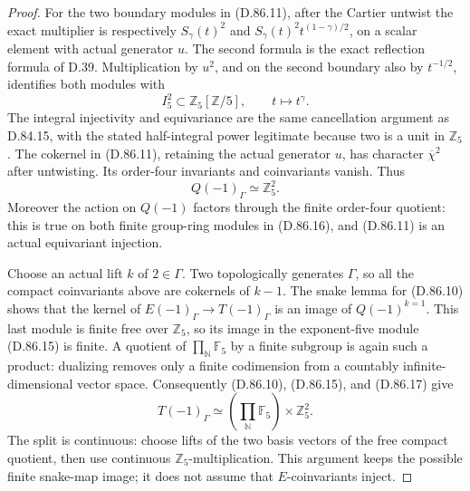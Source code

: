 \begin{proof}
For the two boundary modules in (D.86.11), after the Cartier
untwist the exact multiplier is respectively
\(S_\gamma(t)^2\) and
\(S_\gamma(t)^2t^{(1-\gamma)/2}\), on a scalar element
with actual generator \(u\). The second formula is the exact
reflection formula of D.39. Multiplication by \(u^2\), and
on the second boundary also by \(t^{-1/2}\), identifies both
modules with
\[
 I_5^2\subset\mathbb Z_5[\mathbb Z/5],
 \qquad t\longmapsto t^\gamma.                         \tag{D.86.16}
\]
The integral injectivity and equivariance are the same
cancellation argument as D.84.15, with the stated half-integral
power legitimate because two is a unit in \(\mathbb Z_5\).
The cokernel in (D.86.11), retaining the actual generator \(u\),
has character \(\overline\chi^2\) after untwisting. Its
order-four invariants and coinvariants vanish. Thus
\[
                      Q(-1)_\Gamma\simeq\mathbb Z_5^2.
                                                               \tag{D.86.17}
\]
Moreover the action on \(Q(-1)\) factors through the finite
order-four quotient: this is true on both finite group-ring
modules in (D.86.16), and (D.86.11) is an actual equivariant
injection.

Choose an actual lift \(k\) of \(2\in\Gamma\). Two
topologically generates \(\Gamma\), so all the compact
coinvariants above are cokernels of \(k-1\). The snake lemma
for (D.86.10) shows that the kernel of
\(E(-1)_\Gamma\to T(-1)_\Gamma\) is an image of
\(Q(-1)^{k=1}\). This last module is finite free over
\(\mathbb Z_5\), so its image in the exponent-five module
(D.86.15) is finite. A quotient of
\(\prod_{\mathbb N}\mathbb F_5\) by a finite subgroup is
again such a product: dualizing removes only a finite
codimension from a countably infinite-dimensional vector space.
Consequently (D.86.10), (D.86.15), and (D.86.17) give
\[
 T(-1)_\Gamma\simeq
             \left(\prod_{\mathbb N}\mathbb F_5\right)
                           \times\mathbb Z_5^2.        \tag{D.86.18}
\]
The split is continuous: choose lifts of the two basis vectors
of the free compact quotient, then use continuous
\(\mathbb Z_5\)-multiplication. This argument keeps the
possible finite snake-map image; it does not assume that
\(E\)-coinvariants inject.


\end{proof}
